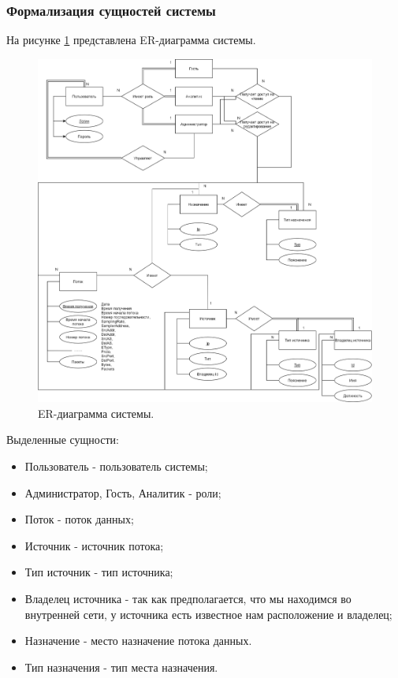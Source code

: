 \subsubsection{Формализация сущностей системы}
На рисунке \ref{ER} представлена ER-диаграмма системы.
\begin{figure}[H]
	\centering
	\includegraphics[scale=0.18]{ER.png}
	\caption{ER-диаграмма системы.}
	\label{ER}
\end{figure}
Выделенные сущности:
\begin{itemize}
	\item[1)] Пользователь - пользователь системы;
	\item[2)] Администратор, Гость, Аналитик - роли;
	\item[3)] Поток - поток данных;
	\item[4)] Источник - источник потока;
	\item[5)] Тип источник - тип источника;
	\item[6)] Владелец источника - так как предполагается, что мы находимся во внутренней сети, у источника есть известное нам расположение и владелец;
	\item[7)] Назначение - место назначение потока данных.
	\item[8)] Тип назначения - тип места назначения.
\end{itemize}

